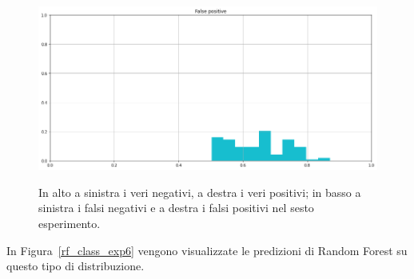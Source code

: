 \documentclass[12pt]{report}
\theoremstyle{definition}
\begin{document}
\begin{figure}
\begin{minipage}{0.48\textwidth}
   \end{minipage}
   \begin{minipage}{0.48\textwidth}
     \includegraphics[width=\linewidth]{images/experiment_beta05_sovrapposti/fp.png}\label{fp_b05s}
   \end{minipage}
   \caption{In alto a sinistra i veri negativi, a destra i veri positivi; in basso a sinistra i falsi negativi e a destra i falsi positivi nel sesto esperimento.}
   \label{4cases_exp6}
\end{figure}
In Figura~\ref{rf_class_exp6} vengono visualizzate le predizioni di Random Forest su questo tipo di distribuzione.
\end{document}
